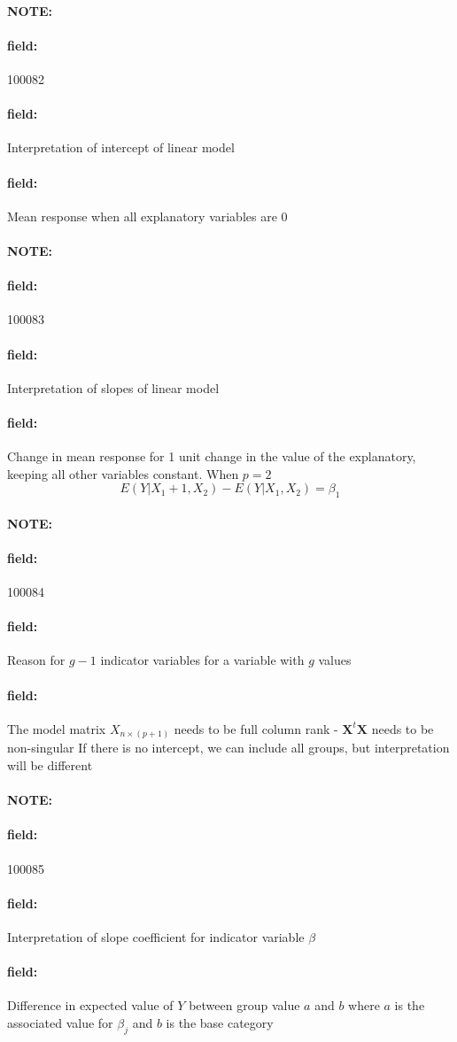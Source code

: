 \documentclass[12pt]{article}
\newenvironment{note}{\paragraph{NOTE:}}{}
\newenvironment{field}{\paragraph{field:}}{}
\begin{document}
\begin{note} \begin{field} \tiny 100082 \end{field}
  \begin{field}
    Interpretation of intercept of linear model
  \end{field}
  \begin{field}
    Mean response when all explanatory variables are 0
  \end{field}
\end{note}



\begin{note} \begin{field} \tiny 100083 \end{field}
  \begin{field}
    Interpretation of slopes of linear model
  \end{field}
  \begin{field}
    Change in mean response for 1 unit change in the value of the explanatory, keeping all other variables constant. When $p = 2$
    $$ E(Y|X_1 + 1, X_2) - E(Y|X_1,X_2) = \beta_1$$
  \end{field}
\end{note}

\begin{note} \begin{field} \tiny 100084 \end{field}
  \begin{field}
    Reason for $g-1$ indicator variables for a variable with $g$ values
  \end{field}
  \begin{field}
    The model matrix $X_{n \times(p+1)}$ needs to be full column rank - $\mathbf{X}^t \mathbf{X}$ needs to be non-singular
    If there is no intercept, we can include all groups, but interpretation will be different
  \end{field}
\end{note}

\begin{note} \begin{field} \tiny 100085 \end{field}
  \begin{field}
    Interpretation of slope coefficient for indicator variable $\beta$
  \end{field}
  \begin{field}
    Difference in expected value of $Y$ between group value $a$ and $b$ where $a$ is the associated value for $\beta_j$ and $b$ is the base category
  \end{field}
\end{note}
\end{document}
